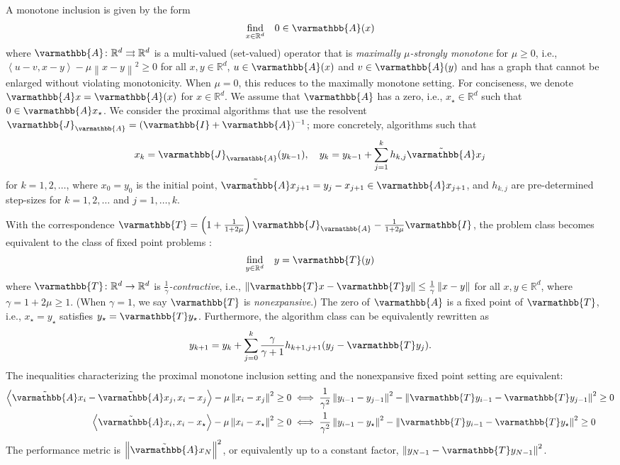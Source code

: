 \documentclass{article}
\theoremstyle{definition}
\theoremstyle{plain}
\newcommand{\reals}{\mathbb{R}}
\newcommand{\opA}{{\varmathbb{A}}}
\newcommand{\opI}{{\varmathbb{I}}}
\newcommand{\opJ}{{\varmathbb{J}}}
\newcommand{\opT}{{\varmathbb{T}}}
\newcommand{\inprod}[2]{\left\langle #1,#2 \right\rangle}
\newcommand{\sqnorm}[1]{\left\| #1 \right\|^2}
\newcommand{\norm}[1]{\left\|#1\right\|}
\begin{document}
A monotone inclusion is given by the form
\[
\begin{array}{cc}
    \underset{x\in \reals^d}{\text{find}} & 0 \in \opA(x)
\end{array}
\]
where $\opA\colon \reals^d \rightrightarrows \reals^d$ is a multi-valued (set-valued) operator that is \emph{maximally $\mu$-strongly monotone} for $\mu \ge 0$, i.e., $\inprod{u-v}{x-y} - \mu \sqnorm{x-y} \ge 0$ for all $x,y\in \reals^d$, $u\in \opA(x)$ and $v\in \opA(y)$ and has a graph that cannot be enlarged without violating monotonicity.
When $\mu=0$, this reduces to the maximally monotone setting.
For conciseness, we denote $\opA x = \opA(x)$ for $x\in \reals^d$.
We assume that $\opA$ has a zero, i.e., $x_\star \in \reals^d$ such that $0 \in \opA x_\star$.
We consider the proximal algorithms that use the resolvent $\opJ_\opA = (\opI + \opA)^{-1}$; more concretely, algorithms such that
\begin{align}
\label{eqn:H-matrix-algorithm-monotone-proximal}
    x_k = \opJ_\opA (y_{k-1}) , \quad
    y_k = y_{k-1} + \sum_{j=1}^k h_{k,j} \tilde{\opA} x_j
\end{align}
for $k=1,2,\dots$, where $x_0 = y_0$ is the initial point, $\tilde{\opA} x_{j+1} = y_j - x_{j+1} \in \opA x_{j+1}$, and $h_{k,j}$ are pre-determined step-sizes for $k=1,2,\dots$ and $j=1,\dots,k$.

With the correspondence $\opT = \left(1 + \frac{1}{1+2\mu}\right) \opJ_\opA - \frac{1}{1+2\mu} \opI$, the problem class becomes equivalent to the class of fixed point problems \citep{ParkRyu2022_exact}:
\begin{align*}
\begin{array}{cc}
    \underset{y \in \reals^d}{\text{find}}  &  y = \opT (y)
\end{array}
\end{align*}
where $\opT\colon \reals^d \to \reals^d$ is \emph{$\frac{1}{\gamma}$-contractive}, i.e., $\norm{\opT x - \opT y} \le \frac{1}{\gamma}\norm{x-y}$ for all $x,y\in \reals^d$,
where $\gamma = 1+2\mu \ge 1$.
(When $\gamma=1$, we say $\opT$ is \emph{nonexpansive}.)
The zero of $\opA$ is a fixed point of $\opT$, i.e., $x_\star = y_\star$ satisfies $y_\star = \opT y_\star$.
Furthermore, the algorithm class can be equivalently rewritten as
\begin{align*}
    y_{k+1} = y_k + \sum_{j=0}^k \frac{\gamma}{\gamma +1} h_{k+1,j+1} (y_j - \opT y_j) .
\end{align*}
The inequalities characterizing the proximal monotone inclusion setting and the nonexpansive fixed point setting are equivalent:
\begin{align*}
    \inprod{\tilde{\opA} x_i - \tilde{\opA} x_j}{x_i - x_j} - \mu \sqnorm{x_i - x_j} \ge 0 & \iff \frac{1}{\gamma^2} \sqnorm{y_{i-1} - y_{j-1}} - \sqnorm{\opT y_{i-1} - \opT y_{j-1}} \ge 0 \\
    \inprod{\tilde{\opA} x_i}{x_i - x_\star} - \mu \sqnorm{x_i - x_\star} \ge 0 & \iff \frac{1}{\gamma^2} \sqnorm{y_{i-1} - y_\star} - \sqnorm{\opT y_{i-1} - \opT y_\star} \ge 0
\end{align*}
The performance metric is $\sqnorm{\tilde{\opA} x_N}$, or equivalently up to a constant factor, $\sqnorm{y_{N-1} - \opT y_{N-1}}$.
\end{document}
